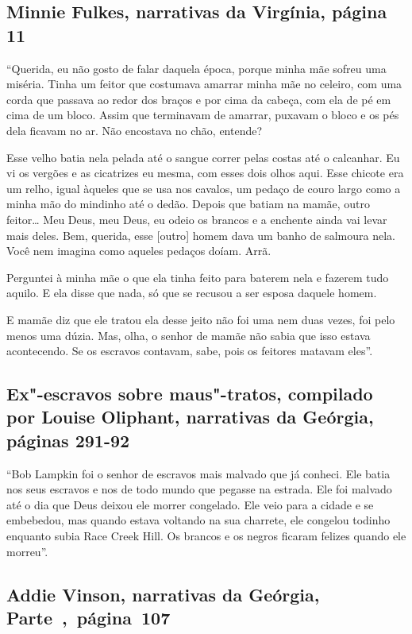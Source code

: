 \subsection{Minnie Fulkes, narrativas da Virgínia, página 11} \label{ref94}

``Querida, eu não gosto de falar daquela época, porque minha mãe sofreu
uma miséria. Tinha um feitor que costumava amarrar minha mãe no celeiro,
com uma corda que passava ao redor dos braços e por cima da cabeça, com
ela de pé em cima de um bloco. Assim que terminavam de amarrar, puxavam
o bloco e os pés dela ficavam no ar. Não encostava no chão, entende?

Esse velho batia nela pelada até o sangue correr pelas costas até o
calcanhar. Eu vi os vergões e as cicatrizes eu mesma, com esses dois
olhos aqui. Esse chicote era um relho, igual àqueles que se usa nos
cavalos, um pedaço de couro largo como a minha mão do mindinho até o
dedão. Depois que batiam na mamãe, outro feitor\ldots{} Meu Deus, meu
Deus, eu odeio os brancos e a enchente ainda vai levar mais deles. Bem,
querida, esse {[}outro{]} homem dava um banho de salmoura nela. Você nem
imagina como aqueles pedaços doíam. Arrã.

Perguntei à minha mãe o que ela tinha feito para baterem nela e fazerem
tudo aquilo. E ela disse que nada, só que se recusou a ser esposa
daquele homem.

E mamãe diz que ele tratou ela desse jeito não foi uma nem duas vezes,
foi pelo menos uma dúzia. Mas, olha, o senhor de mamãe não sabia que
isso estava acontecendo. Se os escravos contavam, sabe, pois os feitores %
matavam eles''.

\subsection{Ex"-escravos sobre maus"-tratos, compilado por Louise Oliphant, narrativas
da Geórgia, páginas 291-92}

``Bob Lampkin foi o senhor de escravos mais malvado que já conheci. Ele
batia nos seus escravos e nos de todo mundo que pegasse na estrada. Ele
foi malvado até o dia que Deus deixou ele morrer congelado. Ele veio
para a cidade e se embebedou, mas quando estava voltando na sua
charrete, ele congelou todinho enquanto subia Race Creek Hill. Os
brancos e os negros ficaram felizes quando ele morreu''.

\subsection{Addie Vinson, narrativas da Geórgia, Parte~,~página~107}
\label{ref267}

